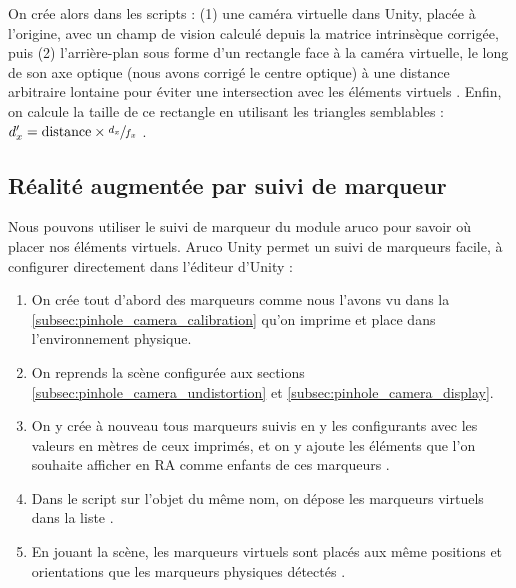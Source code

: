 On crée alors dans les scripts : (1) une caméra virtuelle dans Unity, placée à l'origine, avec un champ de vision calculé  depuis la matrice intrinsèque corrigée, puis (2) l'arrière-plan sous forme d'un rectangle face à la caméra virtuelle, le long de son axe optique (nous avons corrigé le centre optique) à une distance arbitraire lontaine pour éviter une intersection avec les éléments virtuels . Enfin, on calcule la taille de ce rectangle en utilisant les triangles semblables : $d_x' = \text{distance} \times \sfrac{d_x}{f_x}$ .

\subsection{Réalité augmentée par suivi de marqueur}
\label{subsec:pinhole_camera_tracker}




Nous pouvons utiliser le suivi de marqueur du module aruco pour savoir où placer nos éléments virtuels. Aruco Unity permet un suivi de marqueurs facile, à configurer directement dans l'éditeur d'Unity :
\begin{enumerate}
  \item On crée tout d'abord des marqueurs comme nous l'avons vu dans la \autoref{subsec:pinhole_camera_calibration} qu'on imprime et place dans l'environnement physique.
  \item On reprends la scène configurée aux sections \ref{subsec:pinhole_camera_undistortion} et \ref{subsec:pinhole_camera_display}.
  \item On y crée à nouveau tous marqueurs suivis en y les configurants avec les valeurs en mètres de ceux imprimés, et on y ajoute les éléments que l'on souhaite afficher en RA comme enfants de ces marqueurs .
  \item Dans le script  sur l'objet du même nom, on dépose les marqueurs virtuels dans la liste  .
  \item En jouant la scène, les marqueurs virtuels sont placés aux même positions et orientations que les marqueurs physiques détectés .
\end{enumerate}

